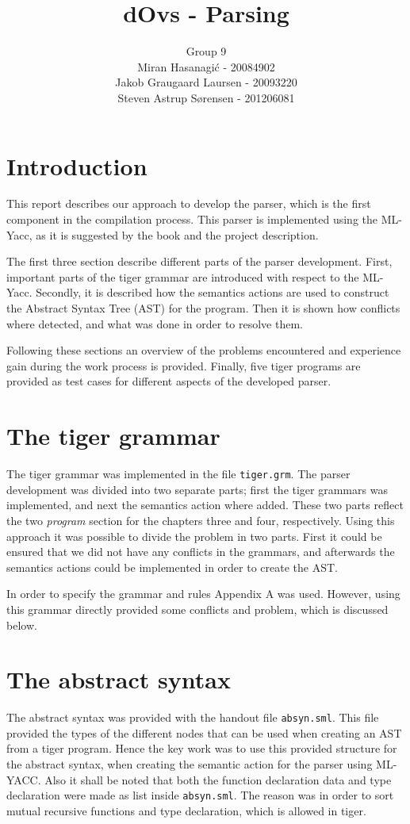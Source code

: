 \documentclass{article}
\title{dOvs - Parsing}
\author{
  Group 9 \\
  Miran Hasanagi\'{c} - 20084902 \\
  Jakob Graugaard Laursen - 20093220\\
  Steven Astrup S\o rensen - 201206081
}
\begin{document}
\maketitle

\section{Introduction}
This report describes our approach to develop the parser, which is the first component in the compilation process. This parser is implemented using the ML-Yacc, as it is suggested by the book and the project description.

The first three section describe different parts of the parser development.
First, important parts of the tiger grammar are introduced with respect to the ML-Yacc. Secondly, it is described how the semantics actions are used to construct the Abstract Syntax Tree (AST) for the program. Then it is shown how conflicts where detected, and what was done in order to resolve them.

Following these sections an overview of the problems encountered and experience gain during the work process is provided. Finally, five tiger programs are provided as test cases for different aspects of the developed parser.

\section{The tiger grammar}

The tiger grammar was implemented in the file \texttt{tiger.grm}. The parser development was divided into two separate parts; first the tiger grammars was implemented, and next the semantics action where added. These two parts reflect the two \textit{program} section for the chapters three and four, respectively. Using this approach it was possible to divide the problem in two parts. First it could be ensured that we did not have any conflicts in the grammars, and afterwards the semantics actions could be implemented in order to create the AST. 

In order to specify the grammar and rules Appendix A was used. However, using this grammar directly provided some conflicts and problem, which is discussed below.  

\section{The abstract syntax}
The abstract syntax was provided with the handout file \texttt{absyn.sml}. This file provided the types of the different nodes that can be used when creating an AST from a tiger program.  Hence the key work was to use this provided structure for the abstract syntax, when creating the semantic action for the parser using ML-YACC. Also it shall be noted that both the function declaration data and type declaration were made as list inside \texttt{absyn.sml}. The reason was in order to sort mutual recursive functions and type declaration, which is allowed in tiger.
\end{document}

